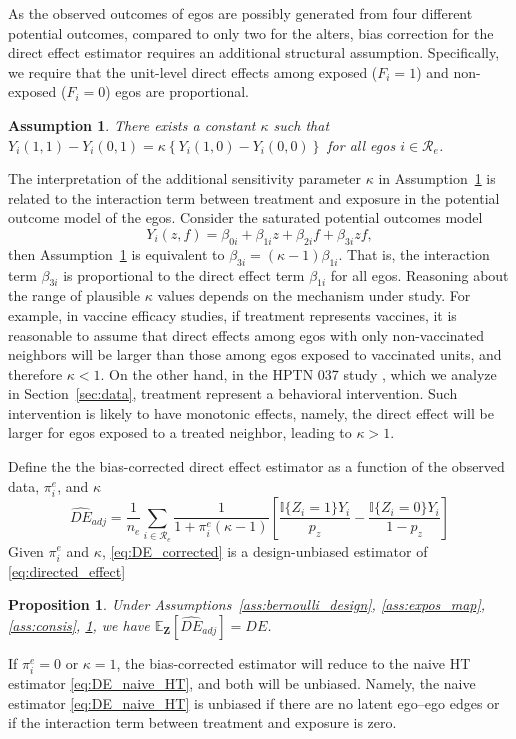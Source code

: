 \documentclass[11pt]{article}
\newtheorem{assumption}{Assumption}
\newtheorem{proposition}{Proposition}
\theoremstyle{definition}
\def \bZ {\boldsymbol{Z}}
\def \cR {\mathcal{R}}
\def \EX {\mathbb{E}}
\begin{document}
As the observed outcomes of egos are possibly generated from four different potential outcomes,
 compared to only two for the alters, bias correction for the direct effect estimator requires an additional structural assumption. 
 Specifically, we require that the unit-level direct effects among exposed ($F_i=1$) and non-exposed ($F_i=0$) egos are proportional.
\begin{assumption}
    \label{ass:egos_kappa}
    There exists a constant $\kappa$ such that 
    $Y_i(1,1) - Y_i(0,1) = \kappa \left\{Y_i(1,0) - Y_i(0,0)\right\}$ for all egos $i \in \cR_e$.
\end{assumption}
The interpretation of the additional sensitivity parameter $\kappa$ in
 Assumption~\ref{ass:egos_kappa} is related to the interaction term between treatment and exposure in the potential outcome model of the egos.
  Consider the saturated potential outcomes model
\begin{equation*}
    Y_i(z,f) = \beta_{0i} + \beta_{1i}z + \beta_{2i}f + \beta_{3i}zf,
\end{equation*}
then Assumption~\ref{ass:egos_kappa} is equivalent to $\beta_{3i} = (\kappa-1)\beta_{1i}$. 
That is, the interaction term $\beta_{3i}$ is proportional to the direct effect term $\beta_{1i}$ for all egos.
Reasoning about the range of plausible $\kappa$ values depends on the mechanism under study. 
For example, in vaccine efficacy studies, if treatment represents vaccines, 
it is reasonable to assume that direct effects among egos with only non-vaccinated neighbors 
will be larger than those among egos exposed to vaccinated units, and therefore $\kappa < 1$.
On the other hand, in the HPTN 037 study \citep{Latkin2009}, 
    which we analyze in Section~\ref{sec:data},
    treatment represent a behavioral intervention.
    Such intervention is likely to have monotonic effects, namely,
    the direct effect will be larger for egos exposed to a treated neighbor, leading to $\kappa > 1$.
    
Define the the bias-corrected direct effect estimator as a function of the observed data, $\pi_i^e$, and $\kappa$
\begin{equation}
    \label{eq:DE_corrected}
    \widehat{DE}_{adj} =
    \frac{1}{n_e}
    \sum_{i \in \cR_e}
    \frac{1}{1 + \pi_i^e(\kappa-1)}
    \left[
    \frac{
    \mathbb{I}\{Z_i=1\}Y_i}{p_z} 
    -
    \frac{
    \mathbb{I}\{Z_i=0\}Y_i}{1 - p_z} 
    \right]
\end{equation}
Given $\pi_i^e$ and $\kappa$, \eqref{eq:DE_corrected} is a design-unbiased estimator of \eqref{eq:directed_effect}
\begin{proposition}
\label{prop:de_sa}
    Under Assumptions~\ref{ass:bernoulli_design}, \ref{ass:expos_map}, \ref{ass:consis}, \ref{ass:egos_kappa}, we have
     $\EX_{\bZ}\left[\widehat{DE}_{adj} \right] = DE$.
\end{proposition}
If $\pi_i^e=0$ or $\kappa=1$, the bias-corrected estimator will reduce to the naive HT estimator \eqref{eq:DE_naive_HT},
 and both will be unbiased.
 Namely, the naive estimator \eqref{eq:DE_naive_HT} is unbiased if there are no latent ego--ego edges
  or if the interaction term between treatment and exposure is zero.
\end{document}
